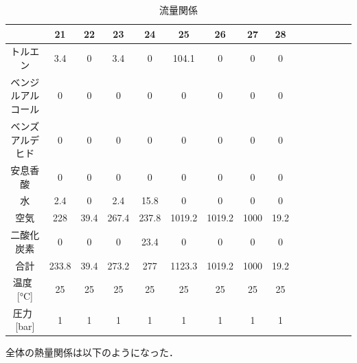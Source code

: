\documentclass[a4j]{jsreport}
\begin{document}
\begin{table}[htbp]
    \caption{流量関係}
    \label{流量関係3}
    \begin{center}
        \begin{tabular}{ccccccccccccccc}
          \hline
          [\si{\kilo \mole \per \hour}] & 21 & 22 & 23 & 24 & 25 & 26 & 27 & 28 &  &  \\
          \hline
          トルエン & 3.4 & 0 & 3.4 & 0 & 104.1 & 0 & 0 & 0 &  &  \\
          ベンジルアルコール & 0 & 0 & 0 & 0 & 0 & 0 & 0 & 0 &  &  \\
          ベンズアルデヒド & 0 & 0 & 0 & 0 & 0 & 0 & 0 & 0 &  &  \\
          安息香酸 & 0 & 0 & 0 & 0 & 0 & 0 & 0 & 0 &  &  \\
          水 & 2.4 & 0 & 2.4 & 15.8 & 0 & 0 & 0 & 0 &  &  \\
          空気 & 228 & 39.4 & 267.4 & 237.8 & 1019.2 & 1019.2 & 1000 & 19.2 &  &  \\
          二酸化炭素 & 0 & 0 & 0 & 23.4 & 0 & 0 & 0 & 0 &  &  \\
          \hline
          合計 & 233.8 & 39.4 & 273.2 & 277 & 1123.3 & 1019.2 & 1000 & 19.2 &  &  \\
          \hline
          温度 \, [\si{\degreeCelsius}] & 25 & 25 & 25 & 25 & 25 & 25 & 25 & 25 &  &  \\
          圧力 \, [\si{\bar}] & 1 & 1 & 1 & 1 & 1 & 1 & 1 & 1 &  &  \\
          \hline
        \end{tabular}
    \end{center}
\end{table}

\clearpage
全体の熱量関係は以下のようになった．

\newpage
\end{document}
